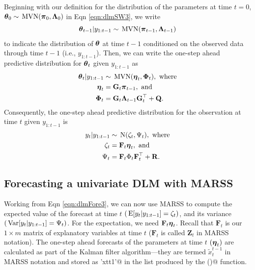 \documentclass[10pt]{article}
\def\FF{\mbox{$\mathbf F$}}
\def\GG{\mbox{$\mathbf G$}}
\def\QQ{\mbox{$\mathbf Q$}}
\def\RR{\mbox{$\mathbf R$}}
\def\ZZ{\mbox{$\mathbf Z$}}
\def\et{\mbox{\boldmath $\eta$}}
\def\pipi{\mbox{\boldmath $\pi$}}
\def\ttheta{\mbox{\boldmath $\theta$}}
\def\LAM{\mbox{\boldmath $\mathrm{\Lambda}$}}
\def\PH{\mbox{\boldmath $\mathrm{\Phi}$}}
\def\var{\,\textup{\textrm{Var}}}
\def\MVN{\,\textup{\textrm{MVN}}}
\def\E{\,\textup{\textrm{E}}}
\def\N{\,\textup{\textrm{N}}}
\begin{document}
Beginning with our definition for the distribution of the parameters at time $t=0$, $\ttheta_0 \sim \MVN(\pipi_0,\LAM_0)$ in Eqn \ref{eqn:dlmSW3}, we write
\begin{equation}\label{eqn:dlmFore1}
\ttheta_{t-1}|y_{1:t-1} \sim \MVN(\pipi_{t-1},\LAM_{t-1})
\end{equation}
to indicate the distribution of $\ttheta$ at time $t-1$ conditioned on the observed data through time $t-1$ (i.e., $y_{1:t-1}$). Then, we can write the one-step ahead predictive distribution for $\ttheta_t$ given $y_{1:t-1}$ as
\begin{align}\label{eqn:dlmFore2}
\ttheta_{t}|y_{1:t-1} &\sim \MVN(\et_{t},\PH_{t}), \text{ where} \nonumber\\
\et_{t} &= \GG_t\pipi_{t-1}, \text{ and}\\
\PH_{t} &= \GG_t\LAM_{t-1}\GG_t^{\top} + \QQ \nonumber.
\end{align}
Consequently, the one-step ahead predictive distribution for the observation at time $t$ given $y_{1:t-1}$ is
\begin{align}\label{eqn:dlmFore3}
y_{t}|y_{1:t-1} &\sim \N(\zeta_{t},\Psi_{t}), \text{ where} \nonumber\\
\zeta_{t} &= \FF_t\et_{t}, \text{ and}\\
\Psi_{t} &= \FF_t\Phi_{t}\FF_t^{\top} + \RR \nonumber.
\end{align}

\subsection{Forecasting a univariate DLM with MARSS}
Working from Eqn \ref{eqn:dlmFore3}, we can now use MARSS to compute the expected value of the forecast at time $t$ $(\E [y_t|y_{1:t-1}] = \zeta_t)$, and its variance $(\var [y_t|y_{1:t-1}] = \Psi_t)$. For the expectation, we need $\FF_t\et_t$. Recall that $\FF_t$ is our $1 \times m$ matrix of explanatory variables at time $t$ ($\FF_t$ is called $\ZZ_t$ in MARSS notation). The one-step ahead forecasts of the parameters at time $t$ $(\et_t)$ are calculated as part of the Kalman filter algorithm---they are termed $\tilde{x}_t^{t-1}$ in MARSS notation and stored as \verb@'xtt1'@ in the list produced by the \verb@MARSSkfss()@ function.
\begin{Schunk}
\end{Schunk}
\end{document}
